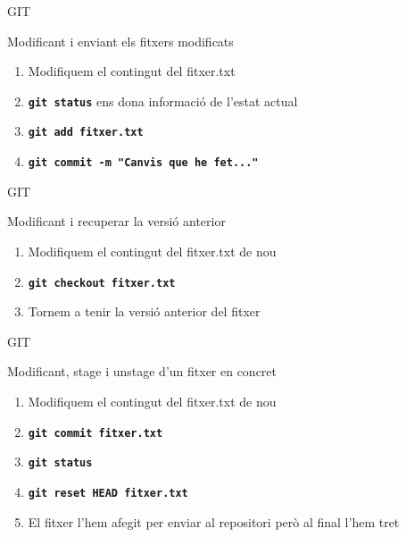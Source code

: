 \documentclass[10pt,xcolor={rgb}]{beamer}
\begin{document}
    \begin{frame}[fragile]{GIT}
      \begin{block}{Modificant i enviant els fitxers modificats}

        \begin{enumerate}
          \item Modifiquem el contingut del fitxer.txt
          \item \texttt{\textbf{git status}} ens dona informació de l'estat actual
          \item \texttt{\textbf{git add fitxer.txt}}
          \item \texttt{\textbf{git commit -m "Canvis que he fet..."}}
        \end{enumerate}

      \end{block}
    \end{frame}

    \begin{frame}[fragile]{GIT}
      \begin{block}{Modificant i recuperar la versió anterior}

        \begin{enumerate}
          \item Modifiquem el contingut del fitxer.txt de nou
          \item \texttt{\textbf{git checkout fitxer.txt}}
          \item Tornem a tenir la versió anterior del fitxer
        \end{enumerate}

      \end{block}
    \end{frame}

    \begin{frame}[fragile]{GIT}
      \begin{block}{Modificant, stage i unstage d'un fitxer en concret}

        \begin{enumerate}
          \item Modifiquem el contingut del fitxer.txt de nou
          \item \texttt{\textbf{git commit fitxer.txt}}
          \item \texttt{\textbf{git status}}
          \item \texttt{\textbf{git reset HEAD fitxer.txt}}
          \item El fitxer l'hem afegit per enviar al repositori però al final l'hem tret
        \end{enumerate}

      \end{block}
    \end{frame}
\end{document}
